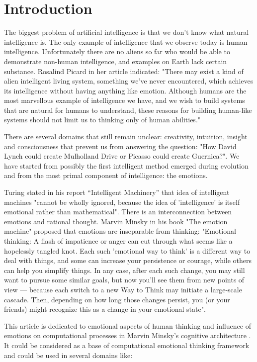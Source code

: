 \section{Introduction}

The biggest problem of artificial intelligence is that we don't know what natural intelligence is. The only example of intelligence that we observe today is human intelligence. Unfortunately there are no aliens so far who would be able to demonstrate non-human intelligence, and examples on Earth lack certain substance. Rosalind Picard in her article indicated: "There may exist a kind of alien intelligent living system, something we’ve never encountered, which achieves its  intelligence without having anything like emotion. Although humans are the most marvellous example of intelligence we have, and we wish to build systems that are natural for humans to understand, these reasons for building human-like systems should not limit us to thinking only of human abilities." \cite{affectivecomputingchallanges}

There are several domains that still remain unclear: creativity, intuition, insight and consciousness that prevent us from answering the question: "How David Lynch could create Mulholland Drive or Picasso could create Guernica?".
We have started from possibly the first intelligent method emerged during evolution and from the most primal component of intelligence: the emotions.

Turing stated in his report ``Intelligent Machinery'' \cite{intelligent_machinery} that idea of intelligent machines "cannot be wholly ignored, because the idea of 'intelligence' is itself emotional rather than mathematical".
There is an interconnection between emotions and rational thought. Marvin Minsky in his book "The emotion machine" proposed that emotions are inseparable from thinking: "Emotional thinking: A flash of impatience or anger can cut through what seems like a hopelessly tangled knot. Each such 'emotional way to think' is a different way to deal with things, and some can increase your persistence or courage, while others can help you simplify things. In any case, after each such change, you may still want to pursue some similar goals, but now you'll see them from new points of view — because each switch to a new Way to Think may initiate a large-scale cascade. Then, depending on how long those changes persist, you (or your friends) might recognize this as a change in your emotional state".

This article is dedicated to emotional aspects of human thinking and influence of emotions on computational processes in Marvin Minsky's cognitive architecture \cite{emotionmachine}. It could be considered as a base of computational emotional thinking framework and could be used in several domains like:

